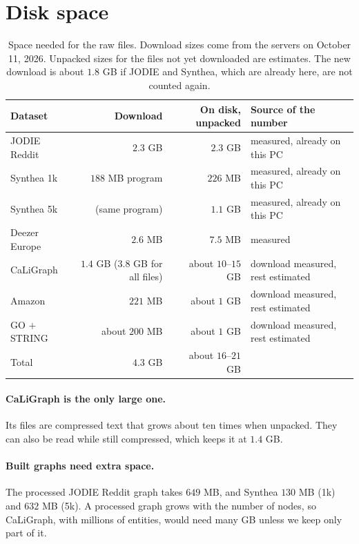 \documentclass[11pt]{article}
\begin{document}
\section*{Disk space}

\begin{table}[H]
\centering
\small
\begin{tabular}{lrrl}
\toprule
Dataset & Download & On disk, unpacked & Source of the number \\
\midrule
JODIE Reddit & $2.3$ GB & $2.3$ GB & measured, already on this PC \\
Synthea 1k & $188$ MB program & $226$ MB & measured, already on this PC \\
Synthea 5k & (same program) & $1.1$ GB & measured, already on this PC \\
Deezer Europe & $2.6$ MB & $7.5$ MB & measured \\
CaLiGraph & $1.4$ GB ($3.8$ GB for all files) & about $10$--$15$ GB & download measured, rest estimated \\
Amazon & $221$ MB & about $1$ GB & download measured, rest estimated \\
GO $+$ STRING & about $200$ MB & about $1$ GB & download measured, rest estimated \\
\midrule
Total & $4.3$ GB & about $16$--$21$ GB & \\
\bottomrule
\end{tabular}
\caption{Space needed for the raw files. Download sizes come from the servers on October 11,
2026. Unpacked sizes for the files not yet downloaded are estimates. The new download is
about $1.8$ GB if JODIE and Synthea, which are already here, are not counted again.}
\end{table}

\paragraph{CaLiGraph is the only large one.} Its files are compressed text that grows about ten
times when unpacked. They can also be read while still compressed, which keeps it at $1.4$ GB.

\paragraph{Built graphs need extra space.} The processed JODIE Reddit graph takes $649$ MB, and
Synthea $130$ MB (1k) and $632$ MB (5k). A processed graph grows with the number of nodes, so
CaLiGraph, with millions of entities, would need many GB unless we keep only part of it.
\end{document}
